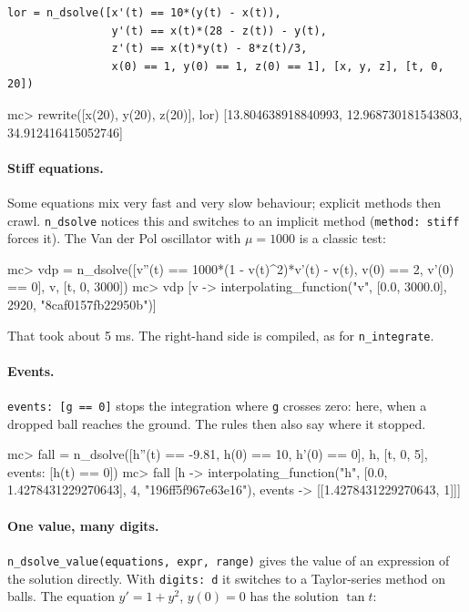 \documentclass[11pt,a4paper]{article}
\newcommand{\code}[1]{\texttt{#1}}
\begin{document}
\begin{lstlisting}
lor = n_dsolve([x'(t) == 10*(y(t) - x(t)),
                y'(t) == x(t)*(28 - z(t)) - y(t),
                z'(t) == x(t)*y(t) - 8*z(t)/3,
                x(0) == 1, y(0) == 1, z(0) == 1], [x, y, z], [t, 0, 20])
\end{lstlisting}
\begin{repl}
mc> rewrite([x(20), y(20), z(20)], lor)
[13.804638918840993, 12.968730181543803, 34.912416415052746]
\end{repl}

\paragraph{Stiff equations.} Some equations mix very fast and very slow behaviour; explicit methods then crawl.
\code{n\_dsolve} notices this and switches to an implicit method (\code{method: stiff} forces it). The Van der Pol
oscillator with $\mu = 1000$ is a classic test:

\begin{repl}
mc> vdp = n_dsolve([v''(t) == 1000*(1 - v(t)^2)*v'(t) - v(t), v(0) == 2, v'(0) == 0], v, [t, 0, 3000])
mc> vdp
[v -> interpolating_function("v", [0.0, 3000.0], 2920, "8caf0157fb22950b")]
\end{repl}

\noindent That took about 5 ms. The right-hand side is compiled, as for \code{n\_integrate}.

\paragraph{Events.} \code{events: [g == 0]} stops the integration where \code{g} crosses zero: here, when a
dropped ball reaches the ground. The rules then also say where it stopped.

\begin{repl}
mc> fall = n_dsolve([h''(t) == -9.81, h(0) == 10, h'(0) == 0], h, [t, 0, 5], events: [h(t) == 0])
mc> fall
[h -> interpolating_function("h", [0.0, 1.4278431229270643], 4, "196ff5f967e63e16"), events -> [[1.4278431229270643, 1]]]
\end{repl}

\paragraph{One value, many digits.} \code{n\_dsolve\_value(equations, expr, range)} gives the value of an
expression of the solution directly. With \code{digits: d} it switches to a Taylor-series method on balls. The
equation $y' = 1 + y^2$, $y(0) = 0$ has the solution $\tan t$:
\end{document}
